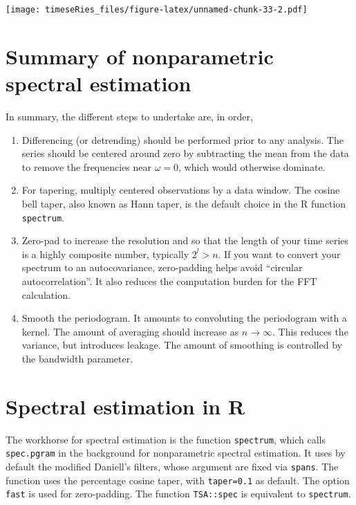\documentclass[]{book}
\providecommand{\tightlist}{%
  \setlength{\itemsep}{0pt}\setlength{\parskip}{0pt}}
\begin{document}
\texttt{[image: timeseRies\_files/figure-latex/unnamed-chunk-33-2.pdf]}

\hypertarget{summary-of-nonparametric-spectral-estimation}{%
\section{Summary of nonparametric spectral
estimation}\label{summary-of-nonparametric-spectral-estimation}}

In summary, the different steps to undertake are, in order,

\begin{enumerate}
\def\labelenumi{\arabic{enumi}.}
\tightlist
\item
  Differencing (or detrending) should be performed prior to any
  analysis. The series should be centered around zero by subtracting the
  mean from the data to remove the frequencies near \(\omega=0\), which
  would otherwise dominate.
\item
  For tapering, multiply centered observations by a data window. The
  cosine bell taper, also known as Hann taper, is the default choice in
  the R function \texttt{spectrum}.
\item
  Zero-pad to increase the resolution and so that the length of your
  time series is a highly composite number, typically \(2^l>n\). If you
  want to convert your spectrum to an autocovariance, zero-padding helps
  avoid ``circular autocorrelation''. It also reduces the computation
  burden for the FFT calculation.
\item
  Smooth the periodogram. It amounts to convoluting the periodogram with
  a kernel. The amount of averaging should increase as \(n \to \infty\).
  This reduces the variance, but introduces leakage. The amount of
  smoothing is controlled by the bandwidth parameter.
\end{enumerate}

\hypertarget{spectral-estimation-in-r}{%
\section{Spectral estimation in R}\label{spectral-estimation-in-r}}

The workhorse for spectral estimation is the function \texttt{spectrum},
which calls \texttt{spec.pgram} in the background for nonparametric
spectral estimation. It uses by default the modified Daniell's filters,
whose argument are fixed via \texttt{spans}. The function uses the
percentage cosine taper, with \texttt{taper=0.1} as default. The option
\texttt{fast} is used for zero-padding. The function \texttt{TSA::spec}
is equivalent to \texttt{spectrum}.
\end{document}

